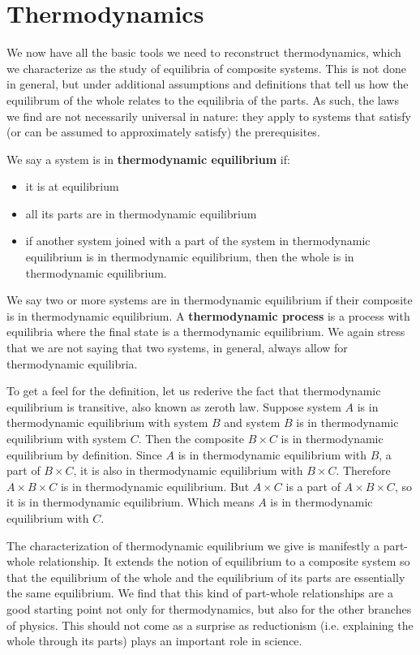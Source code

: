 \documentclass[letterpaper,twocolumn]{article}
\begin{document}
\section{Thermodynamics}

We now have all the basic tools we need to reconstruct thermodynamics, which we characterize as the study of equilibria of composite systems. This is not done in general, but under additional assumptions and definitions that tell us how the equilibrum of the whole relates to the equilibria of the parts. As such, the laws we find are not necessarily universal in nature: they apply to systems that satisfy (or can be assumed to approximately satisfy) the prerequisites.

We say a system is in \textbf{thermodynamic equilibrium} if:
\begin{itemize}
	\item it is at equilibrium
	\item all its parts are in thermodynamic equilibrium
	\item if another system joined with a part of the system in thermodynamic equilibrium is in thermodynamic equilibrium, then the whole is in thermodynamic equilibrium.
\end{itemize}
We say two or more systems are in thermodynamic equilibrium if their composite is in thermodynamic equilibrium. A \textbf{thermodynamic process} is a process with equilibria where the final state is a thermodynamic equilibrium. We again stress that we are not saying that two systems, in general, always allow for thermodynamic equilibria.

To get a feel for the definition, let us rederive the fact that thermodynamic equilibrium is transitive, also known as zeroth law. Suppose system $A$ is in thermodynamic equilibrium with system $B$ and system $B$ is in thermodynamic equilibrium with system $C$. Then the composite $B \times C$ is in thermodynamic equilibrium by definition. Since $A$ is in thermodynamic equilibrium with $B$, a part of $B \times C$, it is also in thermodynamic equilibrium with $B \times C$. Therefore $A \times B \times C$ is in thermodynamic equilibrium. But $A \times C$ is a part of $A \times B \times C$, so it is in thermodynamic equilibrium. Which means $A$ is in thermodynamic equilibrium with $C$.

The characterization of thermodynamic equilibrium we give is manifestly a part-whole relationship. It extends the notion of equilibrium to a composite system so that the equilibrium of the whole and the equilibrium of its parts are essentially the same equilibrium. We find that this kind of part-whole relationships are a good starting point not only for thermodynamics, but also for the other branches of physics. This should not come as a surprise as reductionism (i.e. explaining the whole through its parts) plays an important role in science.
\end{document}
